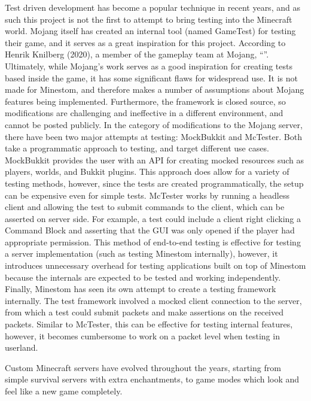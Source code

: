 \documentclass{article}
\begin{document}
\begin{doublespacing}
Test driven development has become a popular technique in recent years, and as such this project is not the first to attempt to bring testing into the Minecraft world. Mojang itself has created an internal tool (named GameTest) for testing their game, and it serves as a great inspiration for this project. According to Henrik Knilberg (2020), a member of the gameplay team at Mojang, “”. Ultimately, while Mojang’s work serves as a good inspiration for creating tests based inside the game, it has some significant flaws for widespread use. It is not made for Minestom, and therefore makes a number of assumptions about Mojang features being implemented. Furthermore, the framework is closed source, so modifications are challenging and ineffective in a different environment, and cannot be posted publicly. In the category of modifications to the Mojang server, there have been two major attempts at testing: MockBukkit and McTester. Both take a programmatic approach to testing, and target different use cases. MockBukkit provides the user with an API for creating mocked resources such as players, worlds, and Bukkit plugins. This approach does allow for a variety of testing methods, however, since the tests are created programmatically, the setup can be expensive even for simple tests. McTester works by running a headless client and allowing the test to submit commands to the client, which can be asserted on server side. For example, a test could include a client right clicking a Command Block and asserting that the GUI was only opened if the player had appropriate permission. This method of end-to-end testing is effective for testing a server implementation (such as testing Minestom internally), however, it introduces unnecessary overhead for testing applications built on top of Minestom because the internals are expected to be tested and working independently. Finally, Minestom has seen its own attempt to create a testing framework internally. The test framework involved a mocked client connection to the server, from which a test could submit packets and make assertions on the received packets. Similar to McTester, this can be effective for testing internal features, however, it becomes cumbersome to work on a packet level when testing in userland.

Custom Minecraft servers have evolved throughout the years, starting from simple survival servers with extra enchantments, to game modes which look and feel like a new game completely.  


\end{doublespacing}
\end{document}
